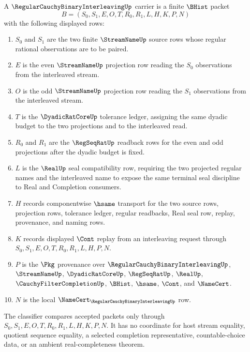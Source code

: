 \begin{definition}
\label{def:regular-cauchy-binary-interleaving-carrier}
A $\RegularCauchyBinaryInterleavingUp$ carrier is a finite $\BHist$ packet
$$
B=(S_0,S_1,E,O,T,R_0,R_1,L,H,K,P,N)
$$
with the following displayed rows:
\begin{enumerate}
\item $S_0$ and $S_1$ are the two finite $\StreamNameUp$ source rows whose regular rational observations are to be paired.
\item $E$ is the even $\StreamNameUp$ projection row reading the $S_0$ observations from the interleaved stream.
\item $O$ is the odd $\StreamNameUp$ projection row reading the $S_1$ observations from the interleaved stream.
\item $T$ is the $\DyadicRatCoreUp$ tolerance ledger, assigning the same dyadic budget to the two projections and to the interleaved read.
\item $R_0$ and $R_1$ are the $\RegSeqRatUp$ readback rows for the even and odd projections after the dyadic budget is fixed.
\item $L$ is the $\RealUp$ seal compatibility row, requiring the two projected regular names and the interleaved name to expose the same terminal seal discipline to Real and Completion consumers.
\item $H$ records componentwise $\hsame$ transport for the two source rows, projection rows, tolerance ledger, regular readbacks, Real seal row, replay, provenance, and naming rows.
\item $K$ records displayed $\Cont$ replay from an interleaving request through $S_0,S_1,E,O,T,R_0,R_1,L,H,P,N$.
\item $P$ is the $\Pkg$ provenance over $\RegularCauchyBinaryInterleavingUp$, $\StreamNameUp$, $\DyadicRatCoreUp$, $\RegSeqRatUp$, $\RealUp$, $\CauchyFilterCompletionUp$, $\BHist$, $\hsame$, $\Cont$, and $\NameCert$.
\item $N$ is the local $\NameCert_{\RegularCauchyBinaryInterleavingUp}$ row.
\end{enumerate}
The classifier compares accepted packets only through $S_0,S_1,E,O,T,R_0,R_1,L,H,K,P,N$. It has no coordinate for host stream equality, quotient sequence equality, a selected completion representative, countable-choice data, or an ambient real-completeness theorem.
\end{definition}


